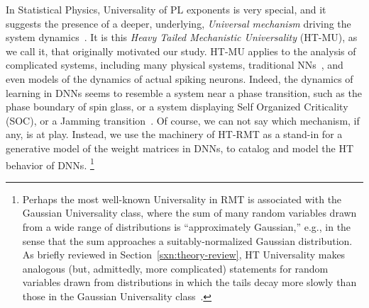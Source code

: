 In Statistical Physics, Universality of PL exponents is very special, and it suggests the presence of a deeper, underlying, \emph{Universal mechanism} driving the system dynamics~\cite{SornetteBook,BouchaudPotters03}.
It is this \emph{Heavy Tailed Mechanistic Universality} (HT-MU), as we call it, that originally motivated our study.  
HT-MU applies to the analysis of complicated systems, including many physical systems, traditional NNs~\cite{EB01_BOOK,nishimori01}, and even models of the dynamics of actual spiking neurons.
Indeed, the dynamics of learning in DNNs 
seems to resemble a system near a phase transition, such as the phase boundary of spin glass, or a system displaying Self Organized Criticality (SOC), or a Jamming transition~\cite{GSdx18_TR,SGd18_TR}. 
Of course, we can not say which mechanism, if any, is at play. 
Instead, we use the machinery of  HT-RMT as a stand-in for a generative model of the weight matrices in DNNs, to catalog and model the HT behavior of DNNs.%
\footnote{Perhaps the most well-known Universality in RMT is associated with the Gaussian Universality class, where the sum of many random variables drawn from a wide range of distributions is ``approximately Gaussian,'' e.g., in the sense that the sum approaches a suitably-normalized Gaussian distribution.  As briefly reviewed in Section~\ref{sxn:theory-review}, HT Universality makes analogous (but, admittedly, more complicated) statements for random variables drawn from distributions in which the tails decay more slowly than those in the Gaussian Universality class~\cite{MM18_TR,MM19_HTSR_ICML}.}
